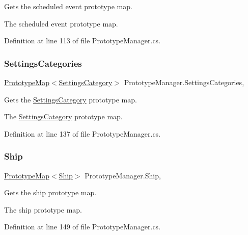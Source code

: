 Gets the scheduled event prototype map. 

The scheduled event prototype map.

Definition at line 113 of file Prototype\+Manager.\+cs.

\mbox{\label{class_prototype_manager_a5da831219902f9c4a65cf214c86403fd}} 
\subsubsection{\texorpdfstring{Settings\+Categories}{SettingsCategories}}
{\footnotesize\ttfamily \hyperlink{class_prototype_map}{Prototype\+Map}$<$\hyperlink{class_settings_category}{Settings\+Category}$>$ Prototype\+Manager.\+Settings\+Categories\hspace{0.3cm}{\ttfamily [static]}, {\ttfamily [get]}}



Gets the \hyperlink{class_settings_category}{Settings\+Category} prototype map. 

The \hyperlink{class_settings_category}{Settings\+Category} prototype map.

Definition at line 137 of file Prototype\+Manager.\+cs.

\mbox{\label{class_prototype_manager_a2e39f326d55d2bab6956b6dc98fd0177}} 
\subsubsection{\texorpdfstring{Ship}{Ship}}
{\footnotesize\ttfamily \hyperlink{class_prototype_map}{Prototype\+Map}$<$\hyperlink{class_ship}{Ship}$>$ Prototype\+Manager.\+Ship\hspace{0.3cm}{\ttfamily [static]}, {\ttfamily [get]}}



Gets the ship prototype map. 

The ship prototype map.

Definition at line 149 of file Prototype\+Manager.\+cs.

\mbox{\label{class_prototype_manager_a99196c3dff2e3d67adf38c852120261b}} 
